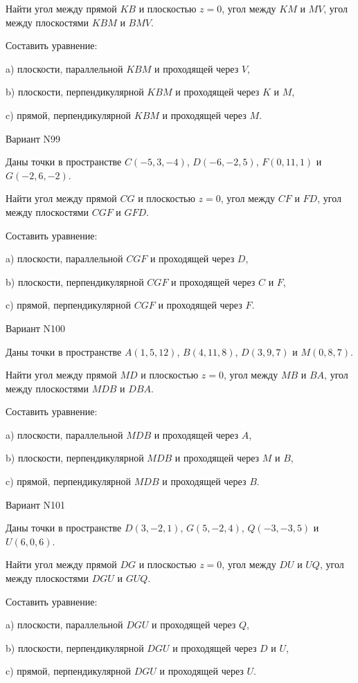 \documentclass[11pt]{report}
\begin{document}
Найти угол между прямой $KB$ и плоскостью $z = 0$, угол между $KM$ и $MV$, угол между плоскостями $KBM$ 
и $BMV$.

Составить уравнение: 

a) плоскости, параллельной $KBM$ и проходящей через $V$,

b) плоскости, перпендикулярной $KBM$ и проходящей через $K$ и $M$,

c) прямой, перпендикулярной $KBM$ и проходящей через $M$.

Вариант N99

Даны точки в пространстве
$C(-5, 3, -4)$, $D(-6, -2, 5)$, $F(0, 11, 1)$ и
$G(-2, 6, -2)$.

Найти угол между прямой $CG$ и плоскостью $z = 0$, угол между $CF$ и $FD$, угол между плоскостями $CGF$ 
и $GFD$.

Составить уравнение: 

a) плоскости, параллельной $CGF$ и проходящей через $D$,

b) плоскости, перпендикулярной $CGF$ и проходящей через $C$ и $F$,

c) прямой, перпендикулярной $CGF$ и проходящей через $F$.

Вариант N100

Даны точки в пространстве
$A(1, 5, 12)$, $B(4, 11, 8)$, $D(3, 9, 7)$ и
$M(0, 8, 7)$.

Найти угол между прямой $MD$ и плоскостью $z = 0$, угол между $MB$ и $BA$, угол между плоскостями $MDB$ 
и $DBA$.

Составить уравнение: 

a) плоскости, параллельной $MDB$ и проходящей через $A$,

b) плоскости, перпендикулярной $MDB$ и проходящей через $M$ и $B$,

c) прямой, перпендикулярной $MDB$ и проходящей через $B$.

Вариант N101

Даны точки в пространстве
$D(3, -2, 1)$, $G(5, -2, 4)$, $Q(-3, -3, 5)$ и
$U(6, 0, 6)$.

Найти угол между прямой $DG$ и плоскостью $z = 0$, угол между $DU$ и $UQ$, угол между плоскостями $DGU$ 
и $GUQ$.

Составить уравнение: 

a) плоскости, параллельной $DGU$ и проходящей через $Q$,

b) плоскости, перпендикулярной $DGU$ и проходящей через $D$ и $U$,

c) прямой, перпендикулярной $DGU$ и проходящей через $U$.
\end{document}
